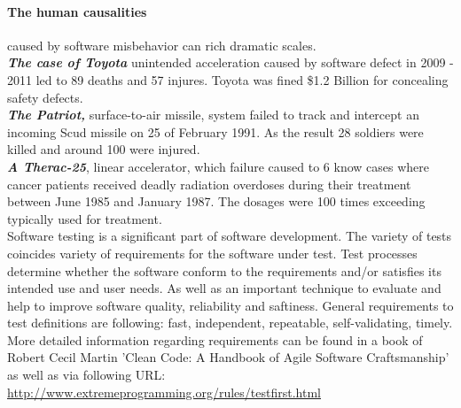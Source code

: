 \paragraph{The human causalities} caused by software misbehavior can rich dramatic scales.\\
\textit{\textbf{The case of Toyota}} unintended acceleration caused by software defect  in 2009 - 2011 led to 89 deaths and 57 injures.
Toyota was fined \$1.2 Billion for concealing safety defects\cite{toyota}.\\
\textit{\textbf{The Patriot,}} surface-to-air missile, system failed to track and intercept an incoming Scud missile on 25 of February 1991. As the result 28 soldiers were killed and around 100 were injured\cite{costOfErrors}.\\
\textit{\textbf{A Therac-25}}, linear accelerator, which failure caused to 6 know cases where cancer patients received deadly radiation overdoses during their treatment between June 1985 and January 1987. The dosages were 100 times exceeding typically used for treatment\cite{costOfErrors}\cite{therac}.\\

Software testing is a significant part of software development\cite{ts}.
The variety of tests coincides variety of requirements for the software under test. Test processes determine whether the software conform to the requirements and/or satisfies its intended use and user needs\cite{ieeeTesting}.
As well as an important technique to evaluate and help to improve software quality, reliability and saftiness\cite{cota}.
General requirements to test definitions are following: fast, independent, repeatable, self-validating, timely.
More detailed information regarding requirements can be found in a book of Robert Cecil Martin 'Clean Code: A Handbook of Agile Software Craftsmanship' \cite{MartinClean} as well as via following URL: \url{http://www.extremeprogramming.org/rules/testfirst.html}









